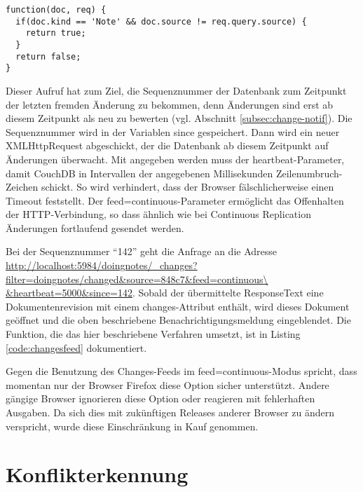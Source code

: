 \lstset{language=javascript}
\medskip 
\begin{lstlisting}[label=code:changesfilter, caption=Der {\fontfamily{pcr}\selectfont changed}-Filter für den Changes-Feed]
function(doc, req) {
  if(doc.kind == 'Note' && doc.source != req.query.source) {
    return true;
  }
  return false;
}
\end{lstlisting}

Dieser Aufruf hat zum Ziel, die Sequenznummer der Datenbank zum Zeitpunkt der letzten fremden Änderung zu bekommen, denn Änderungen sind erst ab diesem Zeitpunkt als neu zu bewerten (vgl. Abschnitt \ref{subsec:change-notif}). Die Sequenznummer wird in der Variablen {\selectfont since} gespeichert. Dann wird ein neuer XMLHttpRequest abgeschickt, der die Datenbank ab diesem Zeitpunkt auf Änderungen überwacht. Mit angegeben werden muss der {\selectfont heartbeat}-Parameter, damit CouchDB in Intervallen der angegebenen Millisekunden Zeilenumbruch-Zeichen schickt. So wird verhindert, dass der Browser fälschlicherweise einen Timeout feststellt. Der {\selectfont feed=continuous}-Parameter ermöglicht das Offenhalten der HTTP-Verbindung, so dass ähnlich wie bei Continuous Replication Änderungen fortlaufend gesendet werden.

Bei der Sequenznummer \enquote{142} geht die Anfrage an die Adresse \url{http://localhost:5984/doingnotes/\_changes?filter=doingnotes/changed&source=848c7&feed=continuous\ &heartbeat=5000&since=142}. Sobald der übermittelte ResponseText eine Dokumentenrevision mit einem {\selectfont changes}-Attribut enthält, wird dieses Dokument geöffnet und die oben beschriebene Benachrichtigungsmeldung eingeblendet. Die Funktion, die das hier beschriebene Verfahren umsetzt, ist in Listing \ref{code:changesfeed} dokumentiert.

Gegen die Benutzung des Changes-Feeds im {\selectfont feed=continuous}-Modus spricht, dass momentan nur der Browser Firefox diese Option sicher unterstützt. Andere gängige Browser ignorieren diese Option oder reagieren mit fehlerhaften Ausgaben. Da sich dies mit zukünftigen Releases anderer Browser zu ändern verspricht, wurde diese Einschränkung in Kauf genommen. 







\section{Konflikterkennung}
\label{subsec:konflikterkennung}


